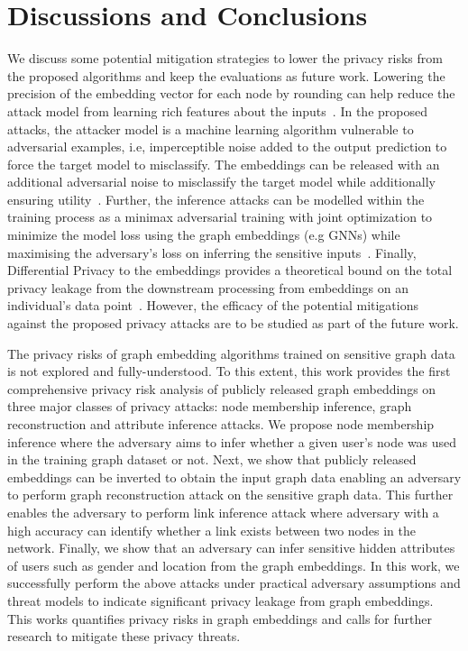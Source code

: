 \section{Discussions and Conclusions}\label{conclusions}

We discuss some potential mitigation strategies to lower the privacy risks from the proposed algorithms and keep the evaluations as future work.
Lowering the precision of the embedding vector for each node by rounding can help reduce the attack model from learning rich features about the inputs~\cite{membershipinf,nlp}.
In the proposed attacks, the attacker model is a machine learning algorithm vulnerable to adversarial examples, i.e, imperceptible noise added to the output prediction to force the target model to misclassify.
The embeddings can be released with an additional adversarial noise to misclassify the target model while additionally ensuring utility~\cite{attriguard,memguard}.
Further, the inference attacks can be modelled within the training process as a minimax adversarial training with joint optimization to minimize the model loss using the graph embeddings (e.g GNNs) while maximising the adversary's loss on inferring the sensitive inputs~\cite{advreg,textembleak}.
Finally, Differential Privacy to the embeddings provides a theoretical bound on the total privacy leakage from the downstream processing from embeddings on an individual's data point~\cite{dptext,dpne}.
However, the efficacy of the potential mitigations against the proposed privacy attacks are to be studied as part of the future work.



The privacy risks of graph embedding algorithms trained on sensitive graph data is not explored and fully-understood.
To this extent, this work provides the first comprehensive privacy risk analysis of publicly released graph embeddings on three major classes of privacy attacks: node membership inference, graph reconstruction and attribute inference attacks.
We propose node membership inference where the adversary aims to infer whether a given user's node was used in the training graph dataset or not.
Next, we show that publicly released embeddings can be inverted to obtain the input graph data enabling an adversary to perform graph reconstruction attack on the sensitive graph data.
This further enables the adversary to perform link inference attack where adversary with a high accuracy can identify whether a link exists between two nodes in the network.
Finally, we show that an adversary can infer sensitive hidden attributes of users such as gender and location from the graph embeddings.
In this work, we successfully perform the above attacks under practical adversary assumptions and threat models to indicate significant privacy leakage from graph embeddings.
This works quantifies privacy risks in graph embeddings and calls for further research to mitigate these privacy threats.
